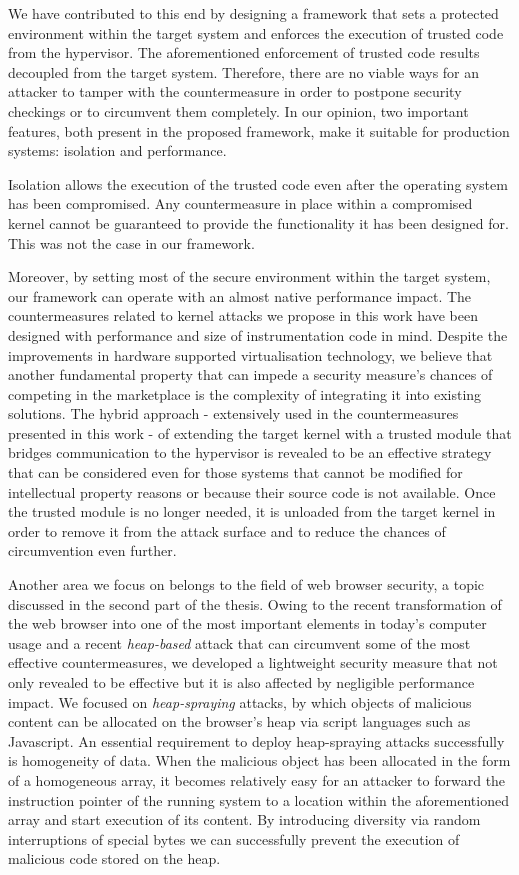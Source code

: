 We have contributed to this end by designing a framework that sets a protected environment within the target system and enforces the execution of trusted code from the hypervisor. The aforementioned enforcement of trusted code results decoupled from the target system. Therefore, there are no viable ways for an attacker to tamper with the countermeasure in order to postpone security checkings or to circumvent them completely. In our opinion, two important features, both present in the proposed framework, make it suitable for production systems: isolation and performance.

Isolation allows the execution of the trusted code even after the operating system has been compromised. Any countermeasure in place within a compromised kernel cannot be guaranteed to provide the functionality it has been designed for. This was not the case in our framework.  

Moreover, by setting most of the secure environment within the target system, our framework can operate with an almost native performance impact. 
The countermeasures related to kernel attacks we propose in this work have been designed with performance and size of instrumentation code in mind. Despite the improvements in hardware supported virtualisation technology, we believe that another fundamental property that can impede a security measure's chances of competing in the marketplace is the complexity of integrating it into existing solutions.
The hybrid approach - extensively used in the countermeasures presented in this work - of extending the target kernel with a trusted module that bridges communication to the hypervisor is revealed to be an effective strategy that can be considered even for those systems that cannot be modified for intellectual property reasons or because their source code is not available. Once the trusted module is no longer needed, it is unloaded from the target kernel in order to remove it from the attack surface and to reduce the chances of circumvention even further.

Another area we focus on belongs to the field of web browser security, a topic discussed in the second part of the thesis.
Owing to the recent transformation of the web browser into one of the most important elements in today's computer 
usage and a recent \emph{heap-based} attack that can circumvent some of the most effective countermeasures, we developed a lightweight security measure that not only revealed to be effective but it is also affected by negligible performance impact. We focused on \emph{heap-spraying} attacks, by which objects of malicious content can be allocated on the browser's heap via script languages such as Javascript. An essential requirement to deploy heap-spraying attacks successfully is homogeneity of data. When the malicious object has been allocated in the form of a homogeneous array, it becomes relatively easy for an attacker to forward the instruction pointer of the running system to a location within the aforementioned array and start execution of its content.
By introducing diversity via random interruptions of special bytes we can successfully prevent the execution of malicious code stored on the heap. 

